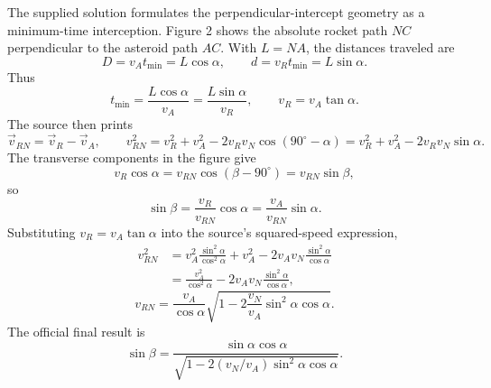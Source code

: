 The supplied solution formulates the perpendicular-intercept geometry
as a minimum-time interception. Figure 2 shows the absolute rocket path
$NC$ perpendicular to the asteroid path $AC$.
With $L=NA$, the distances traveled are
\[
D=v_At_{\min}=L\cos\alpha,\qquad d=v_Rt_{\min}=L\sin\alpha.
\]
Thus
\[
t_{\min}=\frac{L\cos\alpha}{v_A}=\frac{L\sin\alpha}{v_R},
\qquad v_R=v_A\tan\alpha.
\]
The source then prints
\[
\vec v_{RN}=\vec v_R-\vec v_A,
\qquad
v_{RN}^2=v_R^2+v_A^2-2v_Rv_N\cos(90^\circ-\alpha)
=v_R^2+v_A^2-2v_Rv_N\sin\alpha.
\]
The transverse components in the figure give
\[
v_R\cos\alpha=v_{RN}\cos(\beta-90^\circ)=v_{RN}\sin\beta,
\]
so
\[
\sin\beta=\frac{v_R}{v_{RN}}\cos\alpha
  =\frac{v_A}{v_{RN}}\sin\alpha.
\]
Substituting $v_R=v_A\tan\alpha$ into the source's squared-speed expression,
\begin{align*}
v_{RN}^2
 &=v_A^2\frac{\sin^2\alpha}{\cos^2\alpha}+v_A^2
      -2v_Av_N\frac{\sin^2\alpha}{\cos\alpha}\\
 &=\frac{v_A^2}{\cos^2\alpha}
      -2v_Av_N\frac{\sin^2\alpha}{\cos\alpha},
\end{align*}
\[
v_{RN}=\frac{v_A}{\cos\alpha}
\sqrt{1-2\frac{v_N}{v_A}\sin^2\alpha\cos\alpha}.
\]
The official final result is
\[
\boxed{\sin\beta=
\frac{\sin\alpha\cos\alpha}
{\sqrt{1-2(v_N/v_A)\sin^2\alpha\cos\alpha}}}.
\]

